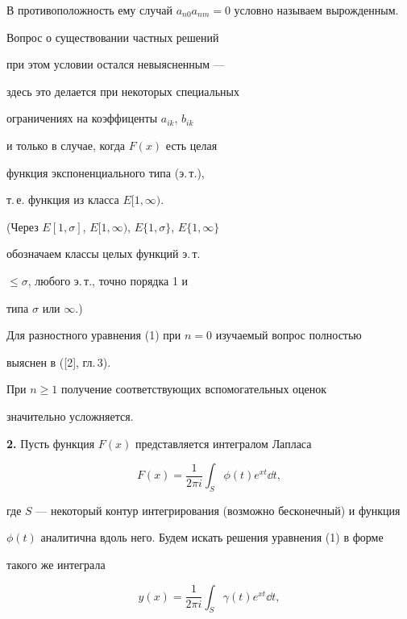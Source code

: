 В противоположность ему случай $a_{n0}a_{nm}=0$ условно называем вырожденным.


Вопрос о существовании частных решений


при этом условии остался невыясненным ---


здесь это делается при некоторых специальных


ограничениях на коэффиценты $a_{ik}$, $b_{ik}$


и только в случае, когда $F(x)$ есть целая


функция экспоненциального типа (э.\,т.),


т.\,е. функция из класса $E[1,\infty)$.


(Через $E[1,\sigma]$, $E[1,\infty)$, $E\{1,\sigma\}$, $E\{1,\infty\}$


обозначаем классы целых функций э.\,т.


$\le\sigma$, любого э.\,т., точно порядка 1 и


типа $\sigma$ или $\infty$.)





Для разностного уравнения (1) при $n=0$ изучаемый вопрос полностью


выяснен в ([2], гл.\,3).


При $n\ge1$ получение соответствующих вспомогательных оценок


значительно усложняется.


\medskip





{\bf 2.} Пусть функция $F(x)$ представляется интегралом Лапласа


\begin{equation}


F(x)=\frac{1}{2\pi i}\int_{S}{\phi(t)e^{xt}\dd t},


\end{equation}


где $S$ --- некоторый контур интегрирования (возможно бесконечный) и функция


$\phi(t)$ аналитична вдоль него. Будем искать решения уравнения (1) в форме


такого же интеграла


\begin{equation}


y(x)=\frac{1}{2\pi i}\int_{S}{\gamma(t)e^{xt}\dd t},


\end{equation}


